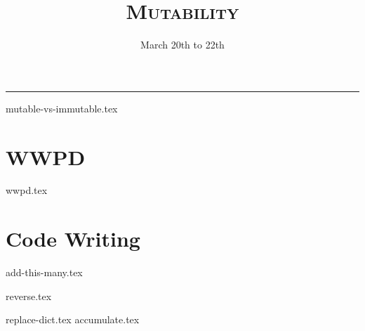 \documentclass{exam}
\title{\textsc{Mutability}}
\date{March 20th to 22th}
\begin{document}
\maketitle
\rule{\textwidth}{0.15em}
\fontsize{12}{15}\selectfont


{mutable-vs-immutable.tex}
\newpage
\section{WWPD}
\begin{questions}

{wwpd.tex}
\newpage

\section{Code Writing}
{add-this-many.tex}

{reverse.tex}

{replace-dict.tex}
\newpage
{accumulate.tex}

\end{questions}
\end{document}
